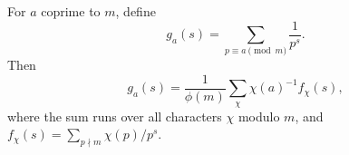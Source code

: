 For $a$ coprime to $m$, define
$$
g_a(s) = \sum_{p \equiv a \pmod{m}} \frac{1}{p^s}.
$$
Then
$$
g_a(s) = \frac{1}{\phi(m)} \sum_\chi \chi(a)^{-1} f_\chi(s),
$$
where the sum runs over all characters $\chi$ modulo $m$, and $f_\chi(s) = \sum_{p \nmid m} \chi(p)/p^s$.
